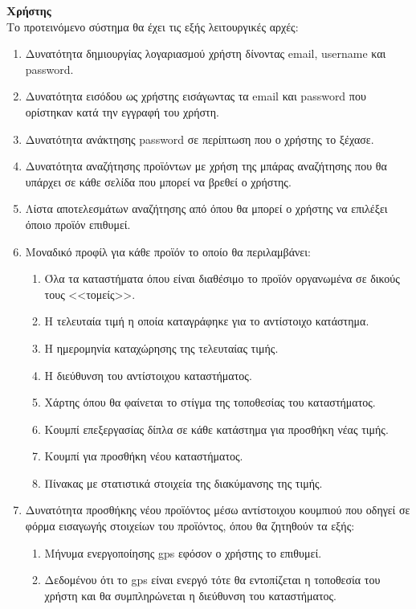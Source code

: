\documentclass[12pt, oneside, a4paper]{report}
\begin{document}
\textbf{Χρήστης}\\
\vspace{0.5cm}
\hspace{0.6cm}Το προτεινόμενο σύστημα θα έχει τις εξής λειτουργικές αρχές:
\begin{enumerate}
 \item Δυνατότητα δημιουργίας λογαριασμού χρήστη δίνοντας email, username και password.
 \item Δυνατότητα εισόδου ως χρήστης εισάγωντας τα email και password που ορίστηκαν κατά την εγγραφή του χρήστη.
 \item Δυνατότητα ανάκτησης password σε περίπτωση που ο χρήστης το ξέχασε.
 \item Δυνατότητα αναζήτησης προϊόντων με χρήση της μπάρας αναζήτησης που θα υπάρχει σε κάθε σελίδα που μπορεί να βρεθεί ο χρήστης.
 \item Λίστα αποτελεσμάτων αναζήτησης από όπου θα μπορεί ο χρήστης να επιλέξει όποιο προϊόν επιθυμεί.
 \item Μοναδικό προφίλ για κάθε προϊόν το οποίο θα περιλαμβάνει:
    \begin{enumerate}
     \item Όλα τα καταστήματα όπου είναι διαθέσιμο το προϊόν οργανωμένα σε δικούς τους <<τομείς>>.
     \item Η τελευταία τιμή η οποία καταγράφηκε για το αντίστοιχο κατάστημα.
     \item Η ημερομηνία καταχώρησης της τελευταίας τιμής.
     \item Η διεύθυνση του αντίστοιχου καταστήματος.
     \item Χάρτης όπου θα φαίνεται το στίγμα της τοποθεσίας του καταστήματος.
     \item Κουμπί επεξεργασίας δίπλα σε κάθε κατάστημα για προσθήκη νέας τιμής.
     \item Κουμπί για προσθήκη νέου καταστήματος.
     \item Πίνακας με στατιστικά στοιχεία της διακύμανσης της τιμής.
    \end{enumerate}
\item Δυνατότητα προσθήκης νέου προϊόντος μέσω αντίστοιχου κουμπιού που οδηγεί σε φόρμα εισαγωγής στοιχείων του προϊόντος, όπου θα ζητηθούν τα εξής:
    \begin{enumerate}
     \item Μήνυμα ενεργοποίησης gps εφόσον ο χρήστης το επιθυμεί.
     \item Δεδομένου ότι το gps είναι ενεργό τότε θα εντοπίζεται η τοποθεσία του χρήστη και θα συμπληρώνεται η διεύθυνση του καταστήματος.

\end{enumerate}
\end{enumerate}
\end{document}

